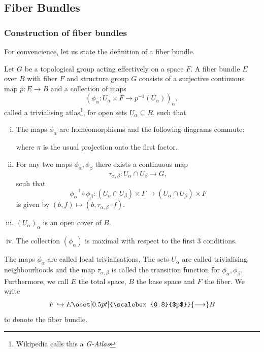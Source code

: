 \subsection{Fiber Bundles}

\subsubsection{Construction of fiber bundles}

For convencience, let us state the definition of a fiber bundle.

\begin{definition}
    \label{def:fiber_bundle}
    Let $G$ be a topological group acting effectively on a space $F$. A fiber bundle $E$ over $B$ with fiber $F$ and structure group $G$ consists of a surjective continuous map $p \colon E \to B$ and a collection of maps 
    \[
    (\phi_\alpha \colon U_\alpha \times F \to p^{-1}(U_\alpha))_\alpha,
    \]
    called a trivialising atlas\footnote{Wikipedia calls this a \textit{G-Atlas}}, for open sets $U_\alpha \subseteq B$, such that 
    \begin{enumerate}[(i)]
        \item The maps $\phi_\alpha$ are homeomorphisms and the following diagrams commute:
        \begin{center}
        \end{center}
        where $\pi$ is the usual projection onto the first factor.
        \item For any two maps $\phi_\alpha, \phi_\beta$ there exists a continuous map
        \[
        \tau_{\alpha,\beta} \colon U_\alpha \cap U_\beta \to G,
        \]
        scuh that
        \[
        \phi_\alpha^{-1} \circ \phi_\beta \colon (U_\alpha \cap U_\beta) \times F \to (U_\alpha \cap U_\beta) \times F
        \]
        is given by $(b,f) \mapsto (b,\tau_{\alpha,\beta} \cdot f)$.
        \item $(U_\alpha)_\alpha$ is an open cover of $B$.
        \item The collection $(\phi_\alpha)$ is maximal with respect to the first 3 conditions.
    \end{enumerate}
    The maps $\phi_\alpha$ are called local trivialisations,  The sets $U_\alpha$ are called trivialising neighbourhoods and the map $\tau_{\alpha,\beta}$ is called the transition function for $\phi_\alpha,\phi_\beta$. Furthermore, we call $E$ the total space, $B$ the base space and $F$ the fiber. We write
    \[
    F \hookrightarrow E \oset[0.5pt]{\scalebox{0.8}{$p$}}{\longrightarrow} B
    \]
    to denote the fiber bundle.
\end{definition}

